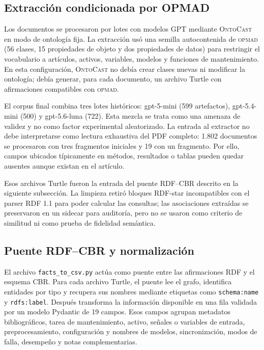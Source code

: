 \documentclass[11pt,a4paper]{article}
\newcommand{\OPMAD}{\textsc{opmad}}
\newcommand{\OntoCast}{\textsc{OntoCast}}
\begin{document}
\subsection{Extracción condicionada por OPMAD}

Los documentos se procesaron por lotes con modelos GPT mediante \OntoCast{} en modo de ontología fija. La extracción usó una semilla autocontenida de \OPMAD{} (56 clases, 15 propiedades de objeto y dos propiedades de datos) para restringir el vocabulario a artículos, activos, variables, modelos y funciones de mantenimiento. En esta configuración, \OntoCast{} no debía crear clases nuevas ni modificar la ontología; debía generar, para cada documento, un archivo Turtle con afirmaciones compatibles con \OPMAD{}.

El corpus final combina tres lotes históricos: gpt-5-mini (599 artefactos), gpt-5.4-mini (500) y gpt-5.6-luna (722). Esta mezcla se trata como una amenaza de validez y no como factor experimental aleatorizado. La entrada al extractor no debe interpretarse como lectura exhaustiva del PDF completo: 1.802 documentos se procesaron con tres fragmentos iniciales y 19 con un fragmento. Por ello, campos ubicados típicamente en métodos, resultados o tablas pueden quedar ausentes aunque existan en el artículo.

Esos archivos Turtle fueron la entrada del puente RDF--CBR descrito en la siguiente subsección. La limpieza retiró bloques RDF-star incompatibles con el parser RDF 1.1 para poder calcular las consultas; las asociaciones extraídas se preservaron en un sidecar para auditoría, pero no se usaron como criterio de similitud ni como prueba de fidelidad semántica.

\subsection{Puente RDF--CBR y normalización}

El archivo \texttt{facts\_to\_csv.py} actúa como puente entre las afirmaciones RDF y el esquema CBR. Para cada archivo Turtle, el puente lee el grafo, identifica entidades por tipo y recupera sus nombres mediante etiquetas como \texttt{schema:name} y \texttt{rdfs:label}. Después transforma la información disponible en una fila validada por un modelo Pydantic de 19 campos. Esos campos agrupan metadatos bibliográficos, tarea de mantenimiento, activo, señales o variables de entrada, preprocesamiento, configuración y nombres de modelos, sincronización, modos de falla, desempeño y notas complementarias.
\end{document}
